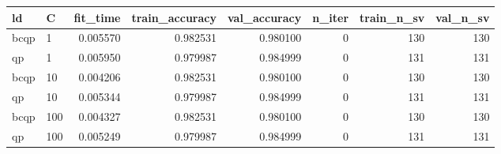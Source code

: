 \begin{tabular}{llrrrrrr}
\toprule
  ld &   C &  fit\_time &  train\_accuracy &  val\_accuracy &  n\_iter &  train\_n\_sv &  val\_n\_sv \\
\midrule
bcqp &   1 &  0.005570 &        0.982531 &      0.980100 &       0 &         130 &       130 \\
  qp &   1 &  0.005950 &        0.979987 &      0.984999 &       0 &         131 &       131 \\
bcqp &  10 &  0.004206 &        0.982531 &      0.980100 &       0 &         130 &       130 \\
  qp &  10 &  0.005344 &        0.979987 &      0.984999 &       0 &         131 &       131 \\
bcqp & 100 &  0.004327 &        0.982531 &      0.980100 &       0 &         130 &       130 \\
  qp & 100 &  0.005249 &        0.979987 &      0.984999 &       0 &         131 &       131 \\
\bottomrule
\end{tabular}
